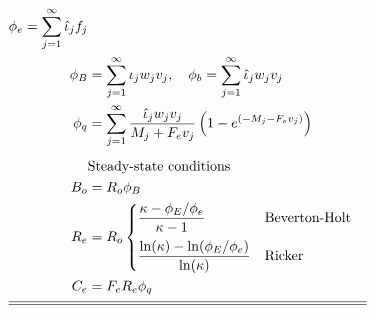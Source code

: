 \begin{table}
\begin{align}
            \phi_e=\sum_{j=1}^\infty \hat{\iota}_j f_j          \label{T2.10}\\
            \phi_B&=\sum_{j=1}^\infty \iota_j w_j v_j, \quad
            \phi_b=\sum_{j=1}^\infty \hat{\iota}_j w_j v_j      \label{T2.11}\\
            \phi_q&=\sum_{j=1}^\infty
                \frac{ \hat{\iota}_j w_j v_j}{M_j+F_ev_j}
                \left(1-e^{(-M_j-F_ev_j)}\right)                \label{T2.11b}\\[1ex]
        &\mbox{Steady-state conditions} \nonumber \\
            B_o&=R_o \phi_B                                     \label{T2.12}\\
            R_e&=R_o\begin{cases}
            \dfrac{\kappa-\phi_E/\phi_e}{\kappa-1}&\mbox{Beverton-Holt}\\[2ex]
            \dfrac{\ln(\kappa)-\ln(\phi_E/\phi_e)}{\ln(\kappa)}& \mbox{Ricker}
            \end{cases}                                         \label{T2.13}\\
            C_e&=F_e R_e \phi_q                                  \label{T2.14}\\[1ex]
        \hline \hline \nonumber
    \end{align}
    \normalEq
\end{table}
 
